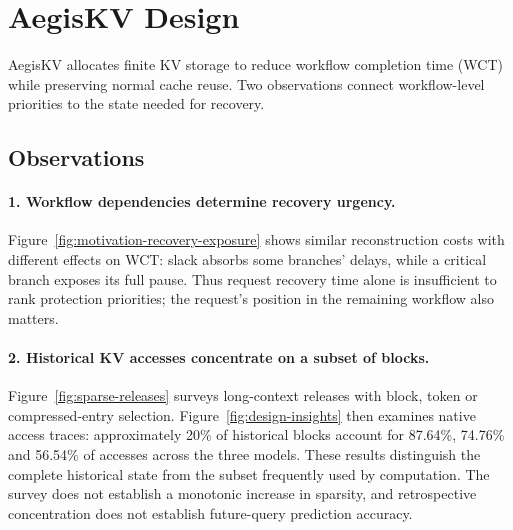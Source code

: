\section{AegisKV Design}
\label{sec:design}

AegisKV allocates finite KV storage to reduce workflow completion time
(WCT) while preserving normal cache reuse. Two observations connect
workflow-level priorities to the state needed for recovery.

\subsection{Observations}
\label{sec:design-insights}

\paragraph{1. Workflow dependencies determine recovery urgency.}
Figure~\ref{fig:motivation-recovery-exposure} shows similar reconstruction
costs with different effects on WCT: slack absorbs some branches' delays,
while a critical branch exposes its full pause. Thus request recovery
time alone is insufficient to rank protection priorities; the request's
position in the remaining workflow also matters.

\paragraph{2. Historical KV accesses concentrate on a subset of blocks.}
Figure~\ref{fig:sparse-releases} surveys long-context releases with block,
token or compressed-entry selection. Figure~\ref{fig:design-insights}
then examines native access traces: approximately 20\% of historical
blocks account for 87.64\%, 74.76\% and 56.54\% of accesses across the
three models. These results distinguish the complete historical state
from the subset frequently used by computation. The survey does not
establish a monotonic increase in sparsity, and retrospective concentration
does not establish future-query prediction accuracy.

